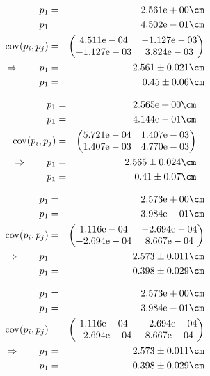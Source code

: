 \begin{eqnarray}
    p_1 &=& 2.561\mathrm{e}+00 \cm \nonumber \\
    p_1 &=& 4.502\mathrm{e}-01 \cm \nonumber \\
    \mathrm{cov}(p_i, p_j) &=& 
    \begin{pmatrix}
        4.511\mathrm{e}-04 &-1.127\mathrm{e}-03 \\
        -1.127\mathrm{e}-03 &3.824\mathrm{e}-03 \\
    \end{pmatrix}
\\ \Rightarrow \qquad
    p_1 &=& 2.561 \pm 0.021 \cm\\
    p_1 &=& 0.45 \pm 0.06 \cm
\end{eqnarray}

\begin{eqnarray}
    p_1 &=& 2.565\mathrm{e}+00 \cm \nonumber \\
    p_1 &=& 4.144\mathrm{e}-01 \cm \nonumber \\
    \mathrm{cov}(p_i, p_j) &=& 
    \begin{pmatrix}
        5.721\mathrm{e}-04 &1.407\mathrm{e}-03 \\
        1.407\mathrm{e}-03 &4.770\mathrm{e}-03 \\
    \end{pmatrix}
\\ \Rightarrow \qquad
    p_1 &=& 2.565 \pm 0.024 \cm\\
    p_1 &=& 0.41 \pm 0.07 \cm
\end{eqnarray}

\begin{eqnarray}
    p_1 &=& 2.573\mathrm{e}+00 \cm \nonumber \\
    p_1 &=& 3.984\mathrm{e}-01 \cm \nonumber \\
    \mathrm{cov}(p_i, p_j) &=& 
    \begin{pmatrix}
        1.116\mathrm{e}-04 &-2.694\mathrm{e}-04 \\
        -2.694\mathrm{e}-04 &8.667\mathrm{e}-04 \\
    \end{pmatrix}
\\ \Rightarrow \qquad
    p_1 &=& 2.573 \pm 0.011 \cm\\
    p_1 &=& 0.398 \pm 0.029 \cm
\end{eqnarray}

\begin{eqnarray}
    p_1 &=& 2.573\mathrm{e}+00 \cm \nonumber \\
    p_1 &=& 3.984\mathrm{e}-01 \cm \nonumber \\
    \mathrm{cov}(p_i, p_j) &=& 
    \begin{pmatrix}
        1.116\mathrm{e}-04 &-2.694\mathrm{e}-04 \\
        -2.694\mathrm{e}-04 &8.667\mathrm{e}-04 \\
    \end{pmatrix}
\\ \Rightarrow \qquad
    p_1 &=& 2.573 \pm 0.011 \cm\\
    p_1 &=& 0.398 \pm 0.029 \cm
\end{eqnarray}

